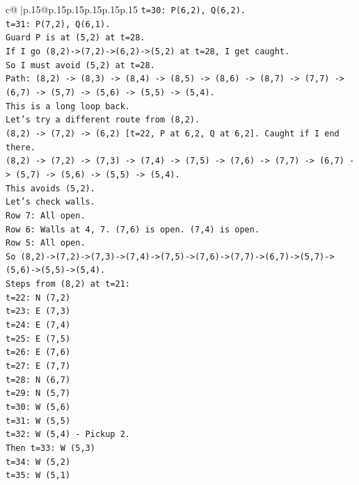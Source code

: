 \documentclass{article}
\begin{document}
{\begin{supertabular}{c@{$\;$}|p{.15\linewidth}@{}p{.15\linewidth}p{.15\linewidth}p{.15\linewidth}p{.15\linewidth}p{.15\linewidth}}
{{{\texttt{t=30: P(6,2), Q(6,2).} \\
\texttt{t=31: P(7,2), Q(6,1).} \\
\texttt{Guard P is at (5,2) at t=28.} \\
\texttt{If I go (8,2){-}>(7,2){-}>(6,2){-}>(5,2) at t=28, I get caught.} \\
\texttt{So I must avoid (5,2) at t=28.} \\
\texttt{Path: (8,2) {-}> (8,3) {-}> (8,4) {-}> (8,5) {-}> (8,6) {-}> (8,7) {-}> (7,7) {-}> (6,7) {-}> (5,7) {-}> (5,6) {-}> (5,5) {-}> (5,4).} \\
\texttt{This is a long loop back.} \\
\texttt{Let's try a different route from (8,2).} \\
\texttt{(8,2) {-}> (7,2) {-}> (6,2) {[}t=22, P at 6,2, Q at 6,2{]}. Caught if I end there.} \\
\texttt{(8,2) {-}> (7,2) {-}> (7,3) {-}> (7,4) {-}> (7,5) {-}> (7,6) {-}> (7,7) {-}> (6,7) {-}> (5,7) {-}> (5,6) {-}> (5,5) {-}> (5,4).} \\
\texttt{This avoids (5,2).} \\
\texttt{Let's check walls.} \\
\texttt{Row 7: All open.} \\
\texttt{Row 6: Walls at 4, 7. (7,6) is open. (7,4) is open.} \\
\texttt{Row 5: All open.} \\
\texttt{So (8,2){-}>(7,2){-}>(7,3){-}>(7,4){-}>(7,5){-}>(7,6){-}>(7,7){-}>(6,7){-}>(5,7){-}>(5,6){-}>(5,5){-}>(5,4).} \\
\texttt{Steps from (8,2) at t=21:} \\
\texttt{t=22: N (7,2)} \\
\texttt{t=23: E (7,3)} \\
\texttt{t=24: E (7,4)} \\
\texttt{t=25: E (7,5)} \\
\texttt{t=26: E (7,6)} \\
\texttt{t=27: E (7,7)} \\
\texttt{t=28: N (6,7)} \\
\texttt{t=29: N (5,7)} \\
\texttt{t=30: W (5,6)} \\
\texttt{t=31: W (5,5)} \\
\texttt{t=32: W (5,4) {-} Pickup 2.} \\
\texttt{Then t=33: W (5,3)} \\
\texttt{t=34: W (5,2)} \\
\texttt{t=35: W (5,1)} \\
}}}
\end{supertabular}}
\end{document}
